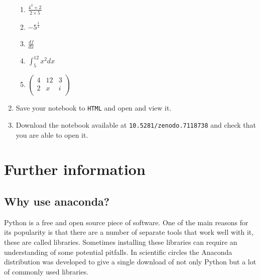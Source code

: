 \begin{enumerate}
\begin{enumerate}
\item 

\(\frac{4 ^ 3 + 2}{2\times 5}\)

\item 

\(- 5 ^ {\frac{1}{2}}\)

\item 

\(\frac{df}{dx}\)

\item 

\(\int_{5}^{12}x^2dx\)

\item 

\(\begin{pmatrix}4 & 12 & 3\\2 & x & i\\\end{pmatrix}\)

\end{enumerate}

\item 

Save your notebook to \texttt{HTML} and open and view it.

\item 

Download the notebook available at
\texttt{10.5281/zenodo.7118738} and
check that you are able to open it.

\end{enumerate}
\section{Further information}

\subsection{Why use anaconda?}

Python is a free and open source piece of software. One of the main reasons for
its popularity is that there are a number of separate tools that work well with
it, these are called libraries. Sometimes installing these libraries can require
an understanding of some potential pitfalls. In scientific circles the Anaconda
distribution was developed to give a single download of not only Python but a
lot of commonly used libraries.

